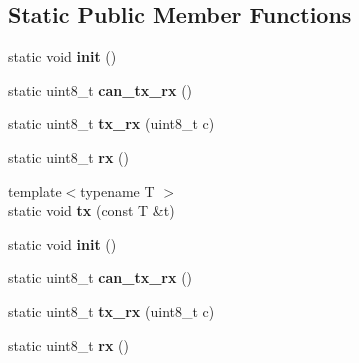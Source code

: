 \subsection*{Static Public Member Functions}
\begin{DoxyCompactItemize}
\item 
static void {\bfseries init} ()\hypertarget{classSpiSync_a07378e5e4ae000daa27ed58b1feeff0e}{}\label{classSpiSync_a07378e5e4ae000daa27ed58b1feeff0e}

\item 
static uint8\+\_\+t {\bfseries can\+\_\+tx\+\_\+rx} ()\hypertarget{classSpiSync_a224c0b96e99813940a1f28ea1ccf1702}{}\label{classSpiSync_a224c0b96e99813940a1f28ea1ccf1702}

\item 
static uint8\+\_\+t {\bfseries tx\+\_\+rx} (uint8\+\_\+t c)\hypertarget{classSpiSync_a8506142258c37b77e4b7e9cc3b9cb849}{}\label{classSpiSync_a8506142258c37b77e4b7e9cc3b9cb849}

\item 
static uint8\+\_\+t {\bfseries rx} ()\hypertarget{classSpiSync_a64929149114cd33c268223123b8d3072}{}\label{classSpiSync_a64929149114cd33c268223123b8d3072}

\item 
{\footnotesize template$<$typename T $>$ }\\static void {\bfseries tx} (const T \&t)\hypertarget{classSpiSync_aa964af94bb9f7a91f2a878ea7ca879c5}{}\label{classSpiSync_aa964af94bb9f7a91f2a878ea7ca879c5}

\item 
static void {\bfseries init} ()\hypertarget{classSpiSync_a07378e5e4ae000daa27ed58b1feeff0e}{}\label{classSpiSync_a07378e5e4ae000daa27ed58b1feeff0e}

\item 
static uint8\+\_\+t {\bfseries can\+\_\+tx\+\_\+rx} ()\hypertarget{classSpiSync_a224c0b96e99813940a1f28ea1ccf1702}{}\label{classSpiSync_a224c0b96e99813940a1f28ea1ccf1702}

\item 
static uint8\+\_\+t {\bfseries tx\+\_\+rx} (uint8\+\_\+t c)\hypertarget{classSpiSync_a8506142258c37b77e4b7e9cc3b9cb849}{}\label{classSpiSync_a8506142258c37b77e4b7e9cc3b9cb849}

\item 
static uint8\+\_\+t {\bfseries rx} ()\hypertarget{classSpiSync_a64929149114cd33c268223123b8d3072}{}\label{classSpiSync_a64929149114cd33c268223123b8d3072}


\end{DoxyCompactItemize}
